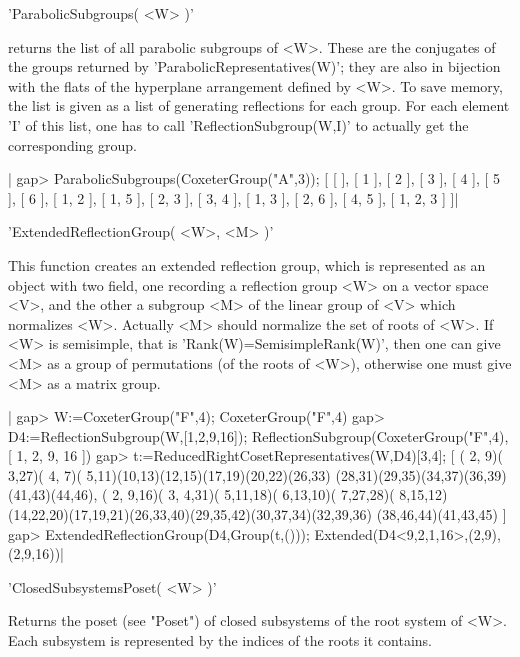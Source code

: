 'ParabolicSubgroups( <W> )'

returns  the  list  of  all  parabolic  subgroups  of  <W>.  These  are the
conjugates  of the  groups returned  by 'ParabolicRepresentatives(W)'; they
are  also in bijection with the flats of the hyperplane arrangement defined
by  <W>.  To  save  memory,  the  list  is  given  as  a list of generating
reflections  for each group. For each element  'I' of this list, one has to
call 'ReflectionSubgroup(W,I)' to actually get the corresponding group.

|    gap> ParabolicSubgroups(CoxeterGroup("A",3));
    [ [  ], [ 1 ], [ 2 ], [ 3 ], [ 4 ], [ 5 ], [ 6 ], [ 1, 2 ], [ 1, 5 ],
      [ 2, 3 ], [ 3, 4 ], [ 1, 3 ], [ 2, 6 ], [ 4, 5 ], [ 1, 2, 3 ] ]|


'ExtendedReflectionGroup( <W>, <M> )'

This function creates an extended reflection group, which is represented as
an  object with two field, one recording a reflection group <W> on a vector
space  <V>, and the other  a subgroup <M> of  the linear group of <V> which
normalizes  <W>. Actually <M> should normalize the  set of roots of <W>. If
<W>  is semisimple, that is  'Rank(W)=SemisimpleRank(W)', then one can give
<M>  as a group of  permutations (of the roots  of <W>), otherwise one must
give <M> as a matrix group.

|    gap> W:=CoxeterGroup("F",4);
    CoxeterGroup("F",4)
    gap> D4:=ReflectionSubgroup(W,[1,2,9,16]);
    ReflectionSubgroup(CoxeterGroup("F",4), [ 1, 2, 9, 16 ])
    gap> t:=ReducedRightCosetRepresentatives(W,D4){[3,4]};
    [ ( 2, 9)( 3,27)( 4, 7)( 5,11)(10,13)(12,15)(17,19)(20,22)(26,33)
        (28,31)(29,35)(34,37)(36,39)(41,43)(44,46),
      ( 2, 9,16)( 3, 4,31)( 5,11,18)( 6,13,10)( 7,27,28)( 8,15,12)
        (14,22,20)(17,19,21)(26,33,40)(29,35,42)(30,37,34)(32,39,36)
        (38,46,44)(41,43,45) ]
    gap> ExtendedReflectionGroup(D4,Group(t,()));
    Extended(D4<9,2,1,16>,(2,9),(2,9,16))|


'ClosedSubsystemsPoset( <W> )'

Returns  the poset (see "Poset") of closed subsystems of the root system of
<W>. Each subsystem is represented by the indices of the roots it contains.

